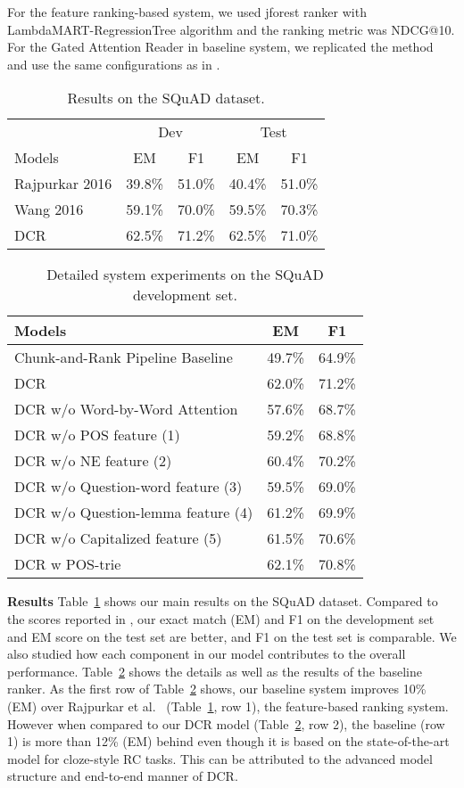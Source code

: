 \documentclass[letterpaper]{article}
\begin{document}
For the feature ranking-based system, we used jforest ranker \cite{Ganji:2011:SIGIR} with LambdaMART-RegressionTree algorithm and the ranking metric was NDCG@10. For the Gated Attention Reader in baseline system, we replicated the method and use the same configurations as in \cite{dhingra2016gated}.

\begin{table}
\caption{Results on the SQuAD dataset.}
\label{tbl_results}
\centering
\begin{tabular}{lcccc}
\hline
&\multicolumn{2}{c}{Dev}&\multicolumn{2}{c}{Test}\\
Models&EM&F1&EM&F1\\
\hline
Rajpurkar 2016&39.8\%&51.0\%&40.4\%&51.0\%\\
Wang 2016&59.1\%&70.0\%&59.5\%&70.3\%\\
DCR &62.5\%&71.2\%&62.5\%&71.0\%\\

\hline
\end{tabular}
\end{table}

\begin{table}
\caption{Detailed system experiments on the SQuAD development set.}
\label{tbl_ablation}
\centering
\begin{tabular}{lcc}
\hline
Models&EM&F1\\
\hline
Chunk-and-Rank Pipeline Baseline &49.7\%&64.9\%\\
\hline
DCR&62.0\%&71.2\%\\
DCR w/o Word-by-Word Attention &57.6\%&68.7\%\\
DCR w/o POS feature (1) &59.2\%&68.8\%\\
DCR w/o NE feature (2) &60.4\%&70.2\%\\
DCR w/o Question-word feature (3) &59.5\% &69.0\%\\
DCR w/o Question-lemma feature (4) & 61.2\%&69.9\%\\
DCR w/o Capitalized feature (5) & 61.5\%&70.6\%\\
\hline
DCR w POS-trie &62.1\% &70.8\% \\
\hline
\end{tabular}
\end{table}

\noindent\textbf{Results}
Table~\ref{tbl_results} shows our main results on the SQuAD dataset. Compared to the scores reported in \cite{wang2016machine}, our exact match (EM) and F1 on the development set and EM score on the test set are better, and F1 on the test set is comparable. We also studied how each component in our model contributes to the overall performance. Table~\ref{tbl_ablation} shows the details as well as the results of the baseline ranker.
As the first row of Table~\ref{tbl_ablation} shows, our baseline system improves 10\% (EM) over Rajpurkar et al.~ (Table~\ref{tbl_results}, row 1), the feature-based ranking system. 
However when compared to our DCR model (Table~\ref{tbl_ablation}, row 2), the baseline (row 1) is more than 12\% (EM) behind even though it is based on the state-of-the-art model for cloze-style RC tasks. This can be attributed to the advanced model structure and end-to-end manner of DCR.
\end{document}
